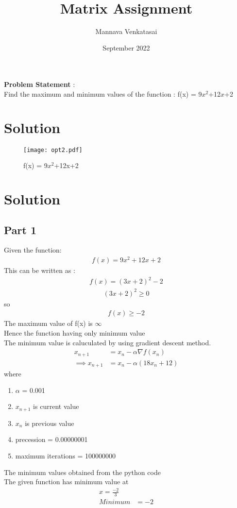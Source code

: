 \documentclass[journal,10pt,twocolumn]{article}
\title{\textbf{Matrix Assignment}}
\author{Mannava Venkatasai}
\date{September 2022}
\providecommand{\brak}[1]{\ensuremath{\left(#1\right)}}
\begin{document}
\maketitle
\raggedright \textbf{Problem Statement} :\vspace{3mm} \\ Find the maximum and minimum values of the function : f(x) = 9$x^2$+12$x$+2 
\section*{Solution}
\begin{figure}[h]
\centering
\texttt{[image: opt2.pdf]}
	\caption{f(x) = 9$x^2$+12x+2}
\label{fig:Curve}
\end{figure}
\section*{Solution}
\subsection*{Part 1}
Given the function:
\begin{align}
f(x) = 9x^2+12x+2 
\end{align}
This can be written as :
\begin{align}
f(x) = (3x+2)^2-2 
\end{align}
\begin{align}
(3x+2)^2\ge 0
\end{align}
so
\begin{align}
f(x) \ge-2 
\end{align}
The maximum value of f(x) is $\infty$ \vspace{5mm} \\
Hence the function having only minimum value \\
The minimum value is caluculated by using gradient descent method.
\begin{align}
        x_{n+1} &= x_n - \alpha \nabla f(x_n) \\
        \implies x_{n+1} &= x_n - \alpha \brak{18x_n+12}
\end{align}
where \\
\begin{enumerate}
\item $\alpha$ = 0.001
\item $x_{n+1}$ is current value
\item $x_{n}$ is previous value
\item precession = 0.00000001
\item maximum iterations = 100000000
\end{enumerate}
The minimum values obtained from the python code \vspace{5mm}\\
The given function has minimum value at
\begin{align} 
x=\frac{-2}{3} \\
Minimum&=-2
\end{align}
\end{document}
